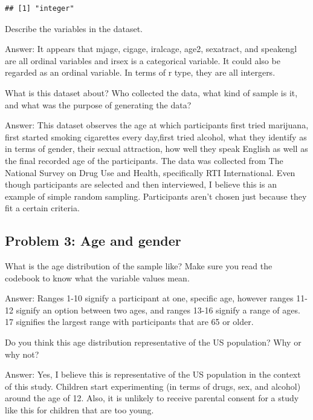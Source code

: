 \documentclass[
]{article}
\newenvironment{Shaded}{\begin{snugshade}}{\end{snugshade}}
\newcommand{\FunctionTok}[1]{\textcolor[rgb]{0.00,0.00,0.00}{#1}}
\newcommand{\NormalTok}[1]{#1}
\newcommand{\SpecialCharTok}[1]{\textcolor[rgb]{0.00,0.00,0.00}{#1}}
\begin{document}
\begin{Shaded}
\end{Shaded}

\begin{verbatim}
## [1] "integer"
\end{verbatim}

Describe the variables in the dataset.

Answer: It appears that mjage, cigage, iralcage, age2, sexatract, and
speakengl are all ordinal variables and irsex is a categorical variable.
It could also be regarded as an ordinal variable. In terms of r type,
they are all intergers.

What is this dataset about? Who collected the data, what kind of sample
is it, and what was the purpose of generating the data?

Answer: This dataset observes the age at which participants first tried
marijuana, first started smoking cigarettes every day,first tried
alcohol, what they identify as in terms of gender, their sexual
attraction, how well they speak English as well as the final recorded
age of the participants. The data was collected from The National Survey
on Drug Use and Health, specifically RTI International. Even though
participants are selected and then interviewed, I believe this is an
example of simple random sampling. Participants aren't chosen just
because they fit a certain criteria.

\hypertarget{problem-3-age-and-gender}{%
\subsection{Problem 3: Age and gender}\label{problem-3-age-and-gender}}

What is the age distribution of the sample like? Make sure you read the
codebook to know what the variable values mean.

Answer: Ranges 1-10 signify a participant at one, specific age, however
ranges 11-12 signify an option between two ages, and ranges 13-16
signify a range of ages. 17 signifies the largest range with
participants that are 65 or older.

Do you think this age distribution representative of the US population?
Why or why not?

Answer: Yes, I believe this is representative of the US population in
the context of this study. Children start experimenting (in terms of
drugs, sex, and alcohol) around the age of 12. Also, it is unlikely to
receive parental consent for a study like this for children that are too
young.
\end{document}
